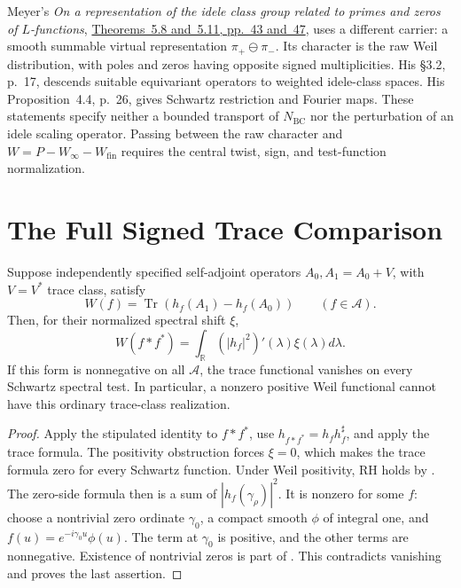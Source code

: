 Meyer's \emph{On a representation of the idele class group related
to primes and zeros of \(L\)-functions},
\href{https://arxiv.org/pdf/math/0311468}{Theorems~5.8 and~5.11,
pp.~43 and~47}, uses a different carrier: a smooth summable
virtual representation \(\pi_+\ominus\pi_-\).
Its character is the raw Weil distribution, with poles and zeros
having opposite signed multiplicities. His \S3.2, p.~17, descends
suitable equivariant operators to weighted idele-class spaces.
His Proposition~4.4, p.~26, gives Schwartz restriction and Fourier
maps. These statements specify neither a bounded transport of
\(N_{\mathrm{BC}}\) nor the perturbation of an idele scaling operator.
Passing between the raw character and \(W=P-W_\infty-W_{\mathrm{fin}}\)
requires the central twist, sign, and test-function normalization.

\section{The Full Signed Trace Comparison}
\label{v4-arith:w7-j:reformulation:identification}
\label{v4-arith:w7-j:comparison}

\begin{theorem}
\label{v4-arith:w7-j:thm:weil-as-shift}
Suppose independently specified self-adjoint operators
\(A_0,A_1=A_0+V\), with \(V=V^*\) trace class, satisfy
\begin{equation}
\label{v4-arith:w7-j:eq:weil-as-shift}
 W(f)=\operatorname{Tr}(h_f(A_1)-h_f(A_0))
 \qquad(f\in\mathscr A).
\end{equation}
Then, for their normalized spectral shift \(\xi\),
\[
 W(f*f^*)=\int_{\mathbb R}(|h_f|^2)'(\lambda)\xi(\lambda)d\lambda.
\]
If this form is nonnegative on all \(\mathscr A\), the trace
functional vanishes on every Schwartz spectral test. In particular,
a nonzero positive Weil functional cannot have this ordinary
trace-class realization.
\end{theorem}
\begin{proof}
Apply the stipulated identity to \(f*f^*\), use
\(h_{f*f^*}=h_fh_f^\sharp\), and apply the trace formula.
The positivity obstruction forces \(\xi=0\), which makes the
trace formula zero for every Schwartz function. Under Weil
positivity, RH holds by .
The zero-side formula then is a sum of \(|h_f(\gamma_\rho)|^2\).
It is nonzero for some \(f\): choose a nontrivial zero ordinate
\(\gamma_0\), a compact smooth \(\phi\) of integral one, and
\(f(u)=e^{-i\gamma_0u}\phi(u)\). The term at \(\gamma_0\) is
positive, and the other terms are nonnegative. Existence of
nontrivial zeros is part of .
This contradicts vanishing and proves the last assertion.
\end{proof}

